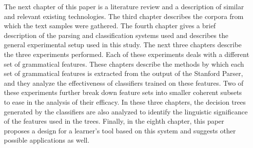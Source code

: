 \documentclass[main.tex]{subfiles}
\begin{document}
The next chapter of this paper is a literature review and a description of similar and relevant existing technologies. The third chapter describes the corpora from which the text samples were gathered. The fourth chapter gives a brief description of the parsing and classification systems used and describes the general experimental setup used in this study. The next three chapters describe the three experiments performed. Each of these experiments deals with a different set of grammatical features. These chapters describe the methods by which each set of grammatical features is extracted from the output of the Stanford Parser, and they analyze the effectiveness of classifiers trained on these features. Two of these experiments further break down feature sets into smaller coherent subsets to ease in the analysis of their efficacy. In these three chapters, the decision trees generated by the classifiers are also analyzed to identify the linguistic significance of the features used in the trees. Finally, in the eighth chapter, this paper proposes a design for a learner's tool based on this system and suggests other possible applications as well.

\biblio
\end{document}
